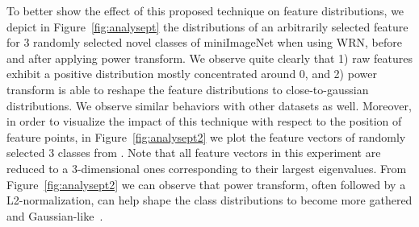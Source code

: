 \documentclass[review]{elsarticle}
\begin{document}
To better show the effect of this proposed technique on feature distributions, we depict in Figure~\ref{fig:analysept} the distributions of an arbitrarily selected feature for 3 randomly selected novel classes of miniImageNet when using WRN, before and after applying power transform. We observe quite clearly that 1) raw features exhibit a positive distribution mostly concentrated around 0, and 2) power transform is able to reshape the feature distributions to close-to-gaussian distributions. We observe similar behaviors with other datasets as well. Moreover, in order to visualize the impact of this technique with respect to the position of feature points, in Figure~\ref{fig:analysept2} we plot the feature vectors of randomly selected 3 classes from . Note that all feature vectors in this experiment are reduced to a 3-dimensional ones corresponding to their largest eigenvalues. From Figure~\ref{fig:analysept2} we can observe that power transform, often followed by a L2-normalization, can help shape the class distributions to become more gathered and Gaussian-like~\cite{DBLP:journals/corr/abs-2102-05176}. 
\end{document}
